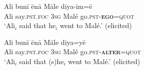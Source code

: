 \documentclass[output=paper]{langsci/langscibook}
\begin{document}
\begin{exe}
	\ex 	\label{ex:jl23}
	\gll Ali bunī ēnā Māle diya-im=ē\\
	Ali say.\textsc{pst}.\textsc{foc} 3\textsc{sg} Malé go.\textsc{pst}-\textbf{\textsc{ego}}=\textsc{quot}\\
	\trans‘Ali$_i$ said that he$_i$ went to Malé.’ (elicited)
\end{exe}

\begin{exe}
	\ex 	\label{ex:jl24}
	\gll Ali bunī ēnā Māle diya=yē\\
	Ali say.\textsc{pst}.\textsc{foc} 3\textsc{sg} Malé go.\textsc{pst}-\textbf{\textsc{alter}}=\textsc{quot}\\
	\trans ‘Ali$_i$ said that (s)he$_i$ went to Malé.’ (elicited)
\end{exe}
\end{document}
